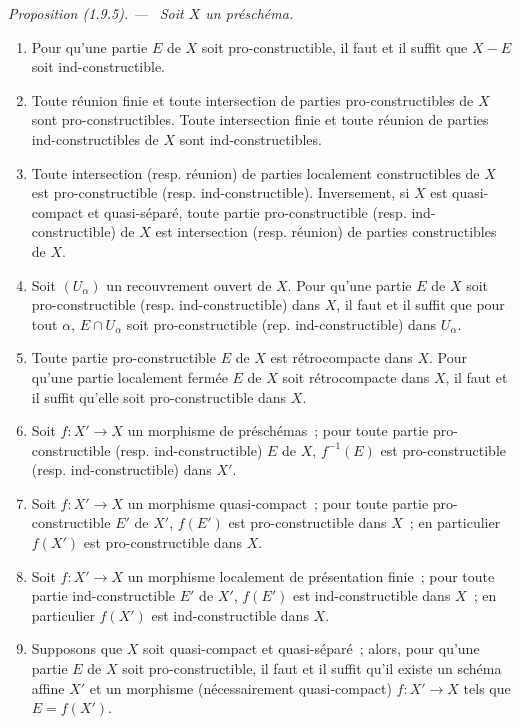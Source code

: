 \documentclass[10pt,oneside]{book}
\makeatletter
\newcommand{\setmanualcurrentlabel}[1]{\def\@currentlabel{#1}}
\newenvironment{proposition}[1][]{%
  \setmanualcurrentlabel{#1}\par\medskip\noindent\itshape Proposition (#1). ---\ }{\par}
\makeatother
\begin{document}
\begin{proposition}[1.9.5]
\label{IV.1.9.5-fr}
Soit $X$ un préschéma.
\begin{enumerate}
  \item[(i)] Pour qu'une partie $E$ de $X$ soit pro-constructible, il faut et
  il suffit que $X-E$ soit ind-constructible.
  \item[(ii)] Toute réunion finie et toute intersection de parties
  pro-constructibles de $X$ sont pro-constructibles. Toute intersection
  finie et toute réunion de parties ind-constructibles de $X$ sont
  ind-constructibles.
  \item[(iii)] Toute intersection (resp. réunion) de parties localement
  constructibles de $X$ est pro-constructible (resp. ind-constructible).
  Inversement, si $X$ est quasi-compact et quasi-séparé, toute partie
  pro-constructible (resp. ind-constructible) de $X$ est intersection (resp.
  réunion) de parties constructibles de $X$.
  \item[(iv)] Soit $(U_\alpha)$ un recouvrement ouvert de $X$. Pour qu'une
  partie $E$ de $X$ soit pro-constructible (resp. ind-constructible) dans
  $X$, il faut et il suffit que pour tout $\alpha$, $E\cap U_\alpha$ soit
  pro-constructible (rep. ind-constructible) dans $U_\alpha$.
  \item[(v)] Toute partie pro-constructible $E$ de $X$ est rétrocompacte
  dans $X$. Pour qu'une partie localement fermée $E$ de $X$ soit
  rétrocompacte dans $X$, il faut et il suffit qu'elle soit
  pro-constructible dans $X$.
  \item[(vi)] Soit $f:X'\to X$ un morphisme de préschémas~; pour toute partie
  pro-constructible (resp. ind-constructible) $E$ de $X$, $f^{-1}(E)$ est
  pro-constructible (resp. ind-constructible) dans $X'$.
  \item[(vii)] Soit $f:X'\to X$ un morphisme quasi-compact~; pour toute
  partie pro-constructible $E'$ de $X'$, $f(E')$ est pro-constructible dans
  $X$~; en particulier $f(X')$ est pro-constructible dans $X$.
  \item[(viii)] Soit $f:X'\to X$ un morphisme localement de présentation
  finie~; pour toute partie ind-constructible $E'$ de $X'$, $f(E')$ est
  ind-constructible dans $X$~; en particulier $f(X')$ est ind-constructible
  dans $X$.
  \item[(ix)] Supposons que $X$ soit quasi-compact et quasi-séparé~; alors,
  pour qu'une partie $E$ de $X$ soit pro-constructible, il faut et il suffit
  qu'il existe un schéma affine $X'$ et un morphisme (nécessairement
  quasi-compact) $f:X'\to X$ tels que $E=f(X')$.
\end{enumerate}
\end{proposition}
\end{document}
